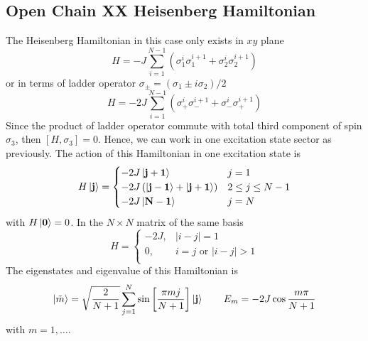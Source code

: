 \documentclass[../../../main.tex]{subfiles}
\begin{document}
\subsection{Open Chain XX Heisenberg Hamiltonian}
The Heisenberg Hamiltonian in this case only exists in $xy$ plane
\begin{equation*}
    H = - J \sum_{i=1 } ^{N-1} (\sigma_{1} ^{i} \sigma_1 ^{i+1} + \sigma_{2} ^{i} \sigma_2 ^{i+1})
\end{equation*}
or in terms of ladder operator $\sigma_{\pm} = (\sigma_1 \pm i\sigma_2 )/2$
\begin{equation*}
    H = - 2J \sum_{i=1 } ^{N-1} (\sigma_{+} ^{i} \sigma_- ^{i+1} + \sigma_{-} ^{i} \sigma_+ ^{i+1})
\end{equation*}
Since the product of ladder operator commute with total third component of spin $\sigma_3$, then $[H,\sigma_3] = 0$.
Hence, we can work in one excitation state sector as previously.
The action of this Hamiltonian in one excitation state is
\begin{equation*}
    H \ket{\mathbf{j}} =
    \begin{cases}
        - 2J \ket{\mathbf{j+1}}                                     & j=1               \\
        - 2J \left( \ket{\mathbf{j-1}} + \ket{\mathbf{j+1}} \right) & 2 \leq j \leq N-1 \\
        - 2J \ket{\mathbf{N-1}}                                     & j=N
    \end{cases}
\end{equation*}
with $H \ket{\mathbf{0}} = 0$.
In the $N \times N$ matrix of the same basis
\begin{equation*}
    H  = \begin{cases}
        -2J, & |i-j|=1                \\
        0,   & i=j\text{ or } |i-j|>1 \\
    \end{cases}
\end{equation*}
The eigenstates and eigenvalue of this Hamiltonian is
\begin{equation*}
    \ket{\tilde{m}  } =
    \sqrt{\frac{2 }{N+1}}\sum_{j=1 }^N  \sin \left[\frac{\pi m j}{N+1} \right] \ket{\mathbf{j}}        \qquad
    E_m = -2J \cos \frac{m \pi }{N+1}
\end{equation*}
with $m=1,\dots$.
\end{document}
